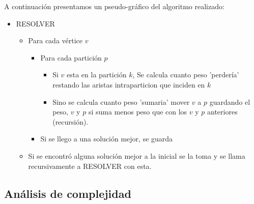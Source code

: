 A continuación presentamos un pseudo-gráfico del algoritmo realizado:

\begin{itemize}
\item RESOLVER
	\begin{itemize}
	\item Para cada vértice $v$
		\begin{itemize}
		\item Para cada partición $p$
			\begin{itemize}
			\item Si $v$ esta en la partición $k$, Se calcula cuanto peso 'perdería' restando las aristas intraparticion que inciden en $k$
			\item Sino se calcula cuanto peso 'sumaria' mover $v$ a $p$ guardando el peso, $v$ y $p$ si suma menos peso que con los $v$ y $p$ anteriores (recursión).
			\end{itemize}
		\item Si se llego a una solución mejor, se guarda
		\end{itemize}
	\item Si se encontró alguna solución mejor a la inicial se la toma y se llama recursivamente a RESOLVER con esta.
	\end{itemize}
\end{itemize}


\subsection{Análisis de complejidad}

